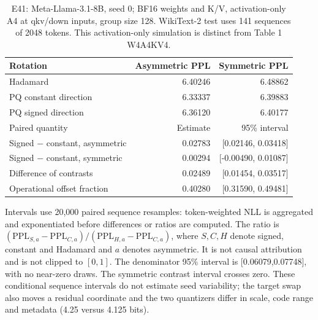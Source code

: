 \begin{table}[t]
\centering
\small
\caption{E41: Meta-Llama-3.1-8B, seed 0; BF16 weights and K/V, activation-only A4 at qkv/down inputs, group size 128. WikiText-2 test uses 141 sequences of 2048 tokens. This activation-only simulation is distinct from Table 1 W4A4KV4.}
\label{tab:e41-mechanism-seed0}
\begin{tabular}{lrr}
\toprule
Rotation & Asymmetric PPL & Symmetric PPL \\
\midrule
Hadamard & 6.40246 & 6.48862 \\
PQ constant direction & 6.33337 & 6.39883 \\
PQ signed direction & 6.36120 & 6.40177 \\
\midrule
Paired quantity & Estimate & 95\% interval \\
\midrule
Signed $-$ constant, asymmetric & 0.02783 & [0.02146, 0.03418] \\
Signed $-$ constant, symmetric & 0.00294 & [-0.00490, 0.01087] \\
Difference of contrasts & 0.02489 & [0.01454, 0.03517] \\
Operational offset fraction & 0.40280 & [0.31590, 0.49481] \\
\bottomrule
\end{tabular}
\par\smallskip
\begin{minipage}{0.98\linewidth}
\footnotesize
Intervals use 20,000 paired sequence resamples: token-weighted NLL is aggregated and exponentiated before differences or ratios are computed. The ratio is $(\mathrm{PPL}_{S,a}-\mathrm{PPL}_{C,a})/(\mathrm{PPL}_{H,a}-\mathrm{PPL}_{C,a})$, where $S,C,H$ denote signed, constant and Hadamard and $a$ denotes asymmetric. It is not causal attribution and is not clipped to $[0,1]$. The denominator 95\% interval is [0.06079,0.07748], with no near-zero draws. The symmetric contrast interval crosses zero. These conditional sequence intervals do not estimate seed variability; the target swap also moves a residual coordinate and the two quantizers differ in scale, code range and metadata (4.25 versus 4.125 bits).
\end{minipage}
\end{table}
